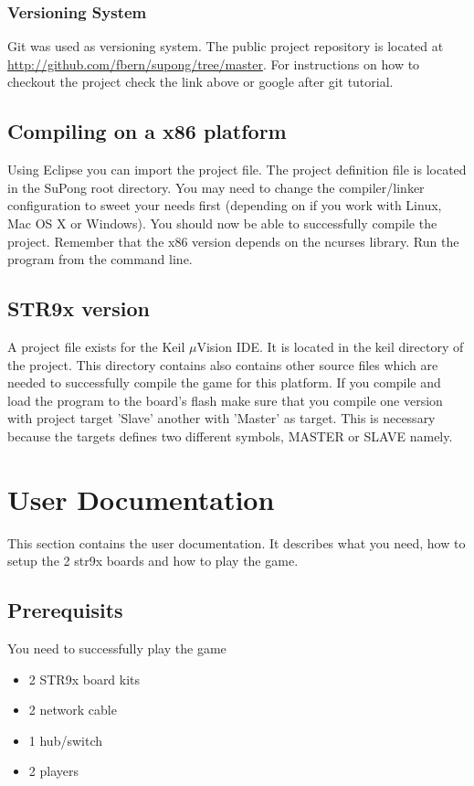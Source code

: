 \subsubsection{Versioning System}
Git was used as versioning system. The public project repository
is located at \url{http://github.com/fbern/supong/tree/master}. For instructions
on how to checkout the project check the link above or google after git
tutorial.

\subsection{Compiling on a x86 platform}
\label{sec_compx86}
Using Eclipse you can import the project file. The project definition file is
located in the SuPong root directory. You may need to change the
compiler/linker configuration to sweet your needs first (depending on if you
work with Linux, Mac OS X or Windows). You should now be able to successfully
compile the project. Remember that the x86 version depends on the ncurses
library. Run the program from the command line.

\subsection{STR9x version}
\label{sec_str9ver}
A project file exists for the Keil $\mu$Vision IDE. It is located in the keil
directory of the project. This directory contains also contains other source
files which are needed to successfully compile the game for this platform.
If you compile and load the program to the board's flash make sure that you
compile one version with project target 'Slave' another with 'Master' as
target. This is necessary because the targets defines two different
symbols, MASTER or SLAVE namely. 

\newpage
\section{User Documentation}
This section contains the user documentation. It describes what you need, how
to setup the 2 str9x boards and how to play the game. 

\subsection{Prerequisits}
You need to successfully play the game
\begin{itemize}
  \item 2 STR9x board kits
  \item 2 network cable
  \item 1 hub/switch
  \item 2 players
\end{itemize}

